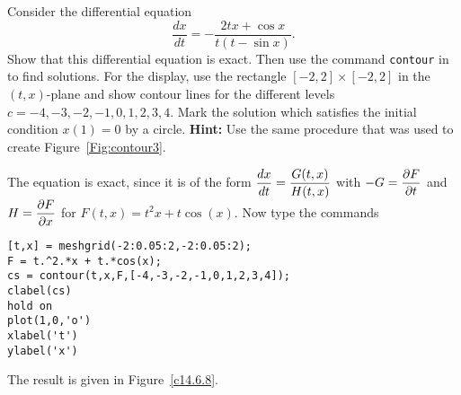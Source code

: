 \documentclass{ximera}
\begin{document}
\begin{exercise} \label{c14.6.8}
Consider the differential equation
\[
\frac{dx}{dt} = -\frac{2tx+\cos x}{t(t-\sin x)}.
\]
Show that this differential equation is 
exact.  Then use the command {\tt contour} in \Matlab 
to find solutions.  For the display, 
use the rectangle $[-2,2]\times [-2,2]$ in the $(t,x)$-plane and show contour
lines for the different levels $c=-4,-3,-2,-1,0,1,2,3,4$.  Mark the solution
which satisfies the initial condition $x(1)=0$ by a circle.
{\bf Hint:} Use the same procedure that was used to create 
Figure~\ref{Fig:contour3}.

\begin{solution}
The equation is exact, since it is of the form
$\displaystyle\frac{dx}{dt} = \frac{G(t,x)}{H(t,x)}$ with
$-G=\displaystyle\frac{\partial F}{\partial t}$ and
$H=\displaystyle\frac{\partial F}{\partial x}$ for $F(t,x) = t^2 x + t\cos(x)$.
Now type the commands
\begin{verbatim}
[t,x] = meshgrid(-2:0.05:2,-2:0.05:2);
F = t.^2.*x + t.*cos(x);
cs = contour(t,x,F,[-4,-3,-2,-1,0,1,2,3,4]);
clabel(cs)
hold on
plot(1,0,'o')
xlabel('t')
ylabel('x')
\end{verbatim}
The result is given in Figure~\ref{c14.6.8}.
\begin{figure}[htb]
     \centerline{%
     }
\end{figure} 




\end{solution}
\end{exercise}
\end{document}
